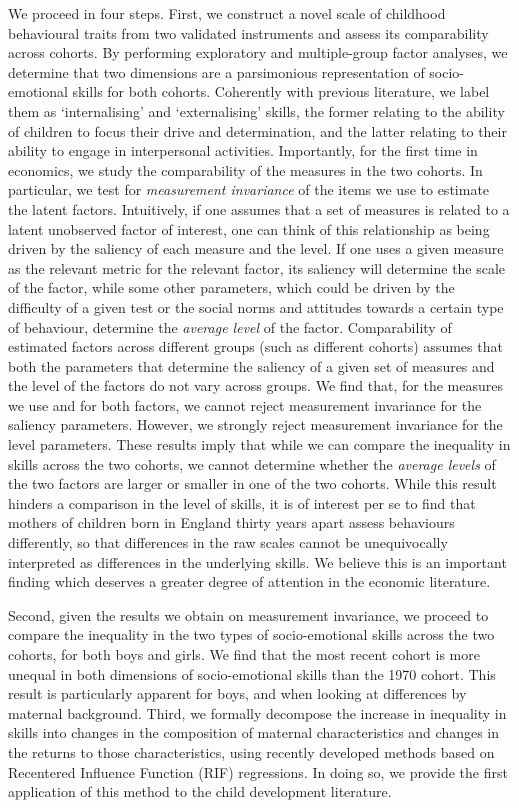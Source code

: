 We proceed in four steps. First, we construct a novel scale of childhood behavioural traits from two validated instruments and assess its comparability across cohorts. By performing exploratory and multiple-group factor analyses, we determine that two dimensions are a parsimonious representation of socio-emotional skills for both cohorts. Coherently with previous literature, we label them as `internalising' and `externalising' skills, the former relating to the ability of children to focus their drive and determination, and the latter relating to their ability to engage in interpersonal activities. Importantly, for the first time in economics, we study the comparability of the measures in the two cohorts. In particular, we test for \emph{measurement invariance} of the items we use to estimate the latent factors. Intuitively, if one assumes that a set of measures is related to a latent unobserved factor of interest, one can think of this relationship as being driven by the saliency of each measure and the level. If one uses a given measure as the relevant metric for the relevant factor, its saliency will determine the scale of the factor, while some other parameters, which could be driven by the difficulty of a given test or the social norms and attitudes towards a certain type of behaviour, determine the \emph{average level} of the factor. Comparability of estimated factors across different groups (such as different cohorts) assumes  that both the parameters that determine the saliency of a given set of measures and the level of the factors do not vary across groups. We find that, for the measures we use and for both factors, we cannot reject measurement invariance for the saliency parameters. However, we strongly reject measurement invariance for the level parameters. These results imply that while we can compare the inequality in skills across the two cohorts, we cannot determine whether the \emph{average levels} of the two factors are larger or smaller in one of the two cohorts. While this result hinders a comparison in the level of skills, it is of interest per se to find that mothers of children born in England thirty years apart assess behaviours differently, so that differences in the raw scales cannot be unequivocally interpreted as differences in the underlying skills. We believe this is an important finding which deserves a greater degree of attention in the economic literature.

Second, given the results we obtain on measurement invariance, we proceed to compare the inequality in the two types of socio-emotional skills across the two cohorts, for both boys and girls. We find that the most recent cohort is more unequal in both dimensions of socio-emotional skills than the 1970 cohort. This result is particularly apparent for boys, and when looking at differences by maternal background. Third, we formally decompose the increase in inequality in skills into changes in the composition of maternal characteristics and changes in the returns to those characteristics, using recently developed methods based on Recentered Influence Function (RIF) regressions. In doing so, we provide the first application of this method to the child development literature.

